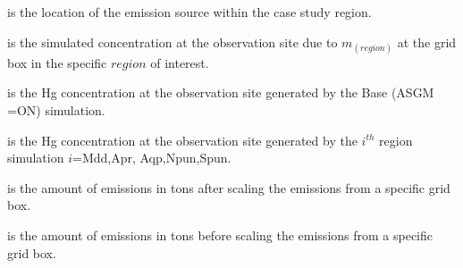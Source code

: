 \begin{description}[leftmargin=!,labelwidth={5 em}]
    \item [$region$] is the location of the emission source within the case study region.
    \item [$Hg^0_{sig(region)}$] is the simulated \hg concentration at the observation site due to $m_{(region)}$ at the grid box in the specific $region $ of interest.
    \item [$Hg_{m_0}$] is the Hg concentration  at the observation site generated by the Base (ASGM =ON) simulation. 
    \item [$Hg_{m_1}$] is the Hg concentration  at the observation site generated by the $i^{th}$ region simulation $i$=Mdd,Apr, Aqp,Npun,Spun. 
    \item [$m_1$] is the amount of emissions in tons after scaling the emissions from a specific grid box.
    \item [$m_0$] is the amount of emissions in tons before scaling the emissions from a specific grid box.
\end{description}




    
    





